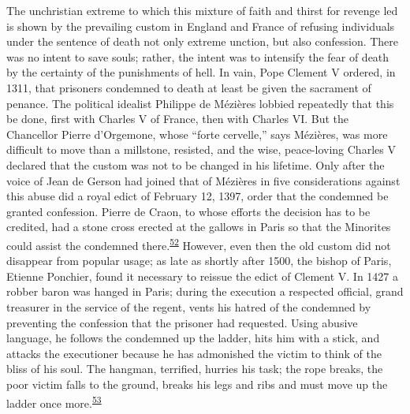 The unchristian extreme to which this mixture of faith and thirst for
revenge led is shown by the prevailing custom in England and France of
refusing individuals under the sentence of death not only extreme
unction, but also confession. There was no intent to save souls; rather,
the intent was to intensify the fear of death by the certainty of the
punishments of hell. In vain, Pope Clement V ordered, in 1311, that
prisoners condemned to death at least be given the sacrament of penance.
The political idealist Philippe de Mézières lobbied repeatedly that this
be done, first with Charles V of France, then with Charles VI. But the
Chancellor Pierre d'Orgemone, whose ``forte cervelle,'' says Mézières,
was more difficult to move than a millstone, resisted, and the wise,
peace-loving Charles V declared that the custom was not to be changed in
his lifetime. Only after the voice of Jean de Gerson had joined that of
Mézières in five considerations against this abuse did a royal edict of
February 12, 1397, order that the condemned be granted confession.
Pierre de Craon, to whose efforts the decision has to be credited, had a
stone cross erected at the gallows in Paris so that the Minorites could
assist the condemned
there.\textsuperscript{\protect\hypertarget{08_Chapter_One__THE_PASSIONATE_INTE.xhtmlux5cux23id_2127}{\protect\hyperlink{23_NOTES.xhtmlux5cux23id_2128}{52}}}
However, even then the old custom did not disappear from popular usage;
as late as shortly after 1500, the bishop of Paris, Etienne Ponchier,
found it necessary to reissue the edict of Clement V. In 1427 a robber
baron was hanged in Paris; during the execution a respected official,
grand treasurer in the service of the regent, vents his hatred of the
condemned by preventing the confession that the prisoner had requested.
Using abusive language, he follows the condemned up the ladder, hits him
with a stick, and attacks the executioner because he has admonished the
victim to think of the bliss of his soul. The
\protect\hypertarget{08_Chapter_One__THE_PASSIONATE_INTE.xhtmlux5cux23page_22}{}{}hangman,
terrified, hurries his task; the rope breaks, the poor victim falls to
the ground, breaks his legs and ribs and must move up the ladder once
more.\textsuperscript{\protect\hypertarget{08_Chapter_One__THE_PASSIONATE_INTE.xhtmlux5cux23id_2125}{\protect\hyperlink{23_NOTES.xhtmlux5cux23id_2126}{53}}}

